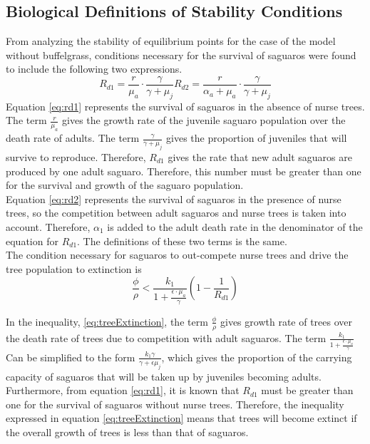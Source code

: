 \documentclass[a4paper]{article}
\begin{document}
\subsection{Biological Definitions of Stability Conditions}
From analyzing the stability of equilibrium points for the case of the model without buffelgrass, conditions necessary for the survival of saguaros were found to include the following two expressions.
\begin{subequations}
\begin{equation}\label{eq:rd1}
R_{d1} = \displaystyle\frac{r}{\mu_a}\cdot\frac{\gamma}{\gamma+\mu_j}
\end{equation}
\begin{equation}\label{eq:rd2}
R_{d2} = \displaystyle\frac{r}{\alpha_a +\mu_a}\cdot\frac{\gamma}{\gamma+\mu_j}
\end{equation}
\end{subequations}
Equation \ref{eq:rd1} represents the survival of saguaros in the absence of nurse trees. The term $\displaystyle\frac{r}{\mu_a}$ gives the growth rate of the juvenile saguaro population over the death rate of adults. The term $\displaystyle\frac{\gamma}{\gamma + \mu_j}$ gives the proportion of juveniles that will survive to reproduce. Therefore, $R_{d1}$ gives the rate that new adult saguaros are produced by one adult saguaro. Therefore, this number must be greater than one for the survival and growth of the saguaro population.\\

Equation \ref{eq:rd2} represents the survival of saguaros in the presence of nurse trees, so the competition between adult saguaros and nurse trees is taken into account. Therefore, $\alpha_1$ is added to the adult death rate in the denominator of the equation for $R_{d1}$. The definitions of these two terms is the same.\\

The condition necessary for saguaros to out-compete nurse trees and drive the tree population to extinction is 
\begin{equation}\label{eq:treeExtinction}
\displaystyle\frac {\phi}{\rho} < \displaystyle \frac{k_1}{1+\displaystyle\frac{\epsilon\cdot\mu_a}{\gamma}}\left(1-\displaystyle\frac{1}{R_{d1}}\right)
\end{equation}

In the inequality, \ref{eq:treeExtinction}, the term $\displaystyle\frac{\phi}{\rho}$ gives growth rate of trees over the death rate of trees due to competition with adult saguaros. The term $\displaystyle \frac{k_1}{1+\displaystyle\frac{\epsilon\cdot\mu_a}{\gamma}}$ Can be simplified to the form $\displaystyle\frac{k_1 \gamma}{\gamma + \epsilon\mu_j}$, which gives the proportion of the carrying capacity of saguaros that will be taken up by juveniles becoming adults. Furthermore, from equation \ref{eq:rd1}, it is known that $R_{d1}$ must be greater than one for the survival of saguaros without nurse trees. Therefore, the inequality expressed in  equation \ref{eq:treeExtinction} means that trees will become extinct if the overall growth of trees is less than that of saguaros.\\
\end{document}
